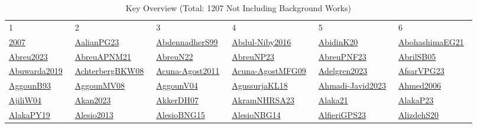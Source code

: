 \begin{longtable}{*{6}{l}}
\rowcolor{white}\caption{Key Overview (Total: 1207 Not Including Background Works)}\\ \toprule
\rowcolor{white}1 & 2 & 3 & 4 & 5 & 6\\ \midrule
\endhead
\bottomrule
\endfoot
\href{../}{2007}~\cite{2007} & \href{../works/AalianPG23.pdf}{AalianPG23}~\cite{AalianPG23} & \href{../works/AbdennadherS99.pdf}{AbdennadherS99}~\cite{AbdennadherS99} & \href{../works/Abdul-Niby2016.pdf}{Abdul-Niby2016}~\cite{Abdul-Niby2016} & \href{../works/AbidinK20.pdf}{AbidinK20}~\cite{AbidinK20} & \href{../works/AbohashimaEG21.pdf}{AbohashimaEG21}~\cite{AbohashimaEG21}\\ 
\href{../works/Abreu2023.pdf}{Abreu2023}~\cite{Abreu2023} & \href{../works/AbreuAPNM21.pdf}{AbreuAPNM21}~\cite{AbreuAPNM21} & \href{../works/AbreuN22.pdf}{AbreuN22}~\cite{AbreuN22} & \href{../works/AbreuNP23.pdf}{AbreuNP23}~\cite{AbreuNP23} & \href{../works/AbreuPNF23.pdf}{AbreuPNF23}~\cite{AbreuPNF23} & \href{../works/AbrilSB05.pdf}{AbrilSB05}~\cite{AbrilSB05}\\ 
\href{../}{Abuwarda2019}~\cite{Abuwarda2019} & \href{../works/AchterbergBKW08.pdf}{AchterbergBKW08}~\cite{AchterbergBKW08} & \href{../works/Acuna-Agost2011.pdf}{Acuna-Agost2011}~\cite{Acuna-Agost2011} & \href{../works/Acuna-AgostMFG09.pdf}{Acuna-AgostMFG09}~\cite{Acuna-AgostMFG09} & \href{../works/Adelgren2023.pdf}{Adelgren2023}~\cite{Adelgren2023} & \href{../works/AfsarVPG23.pdf}{AfsarVPG23}~\cite{AfsarVPG23}\\ 
\href{../works/AggounB93.pdf}{AggounB93}~\cite{AggounB93} & \href{../}{AggounMV08}~\cite{AggounMV08} & \href{../}{AggounV04}~\cite{AggounV04} & \href{../works/AgussurjaKL18.pdf}{AgussurjaKL18}~\cite{AgussurjaKL18} & \href{../}{Ahmadi-Javid2023}~\cite{Ahmadi-Javid2023} & \href{../works/Ahmed2006.pdf}{Ahmed2006}~\cite{Ahmed2006}\\ 
\href{../}{AjiliW04}~\cite{AjiliW04} & \href{../works/Akan2023.pdf}{Akan2023}~\cite{Akan2023} & \href{../works/AkkerDH07.pdf}{AkkerDH07}~\cite{AkkerDH07} & \href{../works/AkramNHRSA23.pdf}{AkramNHRSA23}~\cite{AkramNHRSA23} & \href{../works/Alaka21.pdf}{Alaka21}~\cite{Alaka21} & \href{../works/AlakaP23.pdf}{AlakaP23}~\cite{AlakaP23}\\ 
\href{../works/AlakaPY19.pdf}{AlakaPY19}~\cite{AlakaPY19} & \href{../works/Alesio2013.pdf}{Alesio2013}~\cite{Alesio2013} & \href{../works/AlesioBNG15.pdf}{AlesioBNG15}~\cite{AlesioBNG15} & \href{../works/AlesioNBG14.pdf}{AlesioNBG14}~\cite{AlesioNBG14} & \href{../works/AlfieriGPS23.pdf}{AlfieriGPS23}~\cite{AlfieriGPS23} & \href{../}{AlizdehS20}~\cite{AlizdehS20}\\ 

\end{longtable}
